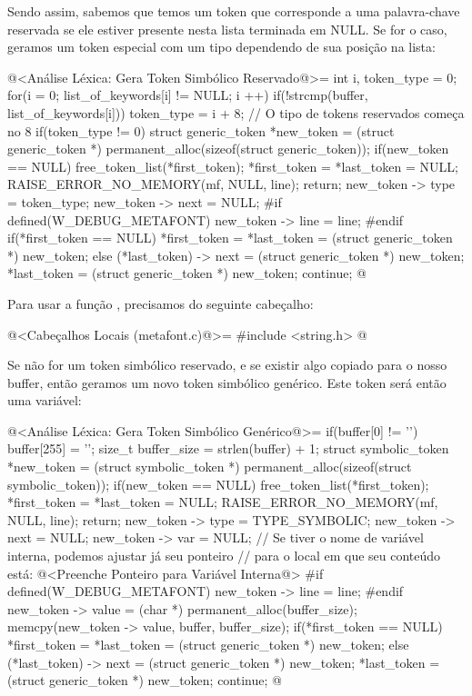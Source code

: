 Sendo assim, sabemos que temos um token que corresponde a uma
palavra-chave reservada se ele estiver presente nesta lista terminada
em NULL. Se for o caso, geramos um token especial com um tipo
dependendo de sua posição na lista:

\iniciocodigo
@<Análise Léxica: Gera Token Simbólico Reservado@>=
{
  int i, token_type = 0;
  for(i = 0; list_of_keywords[i] != NULL; i ++)
    if(!strcmp(buffer, list_of_keywords[i]))
      token_type = i + 8; // O tipo de tokens reservados começa no 8
  if(token_type != 0){
    struct generic_token *new_token =
       (struct generic_token *) permanent_alloc(sizeof(struct generic_token));
    if(new_token == NULL){
      free_token_list(*first_token);
      *first_token = *last_token = NULL;
      RAISE_ERROR_NO_MEMORY(mf, NULL, line);
      return;
    }
    new_token -> type = token_type;
    new_token -> next = NULL;
#if defined(W_DEBUG_METAFONT)
    new_token -> line = line;
#endif
    if(*first_token == NULL)
      *first_token = *last_token = (struct generic_token *) new_token;
    else{
      (*last_token) -> next = (struct generic_token *) new_token;
      *last_token = (struct generic_token *) new_token;
    }
    continue;
  }
}
@
\fimcodigo

Para usar a função , precisamos do seguinte
cabeçalho:

\iniciocodigo
@<Cabeçalhos Locais (metafont.c)@>=
#include <string.h>
@
\fimcodigo

Se não for um token simbólico reservado, e se existir algo copiado
para o nosso buffer, então geramos um novo token simbólico
genérico. Este token será então uma variável:

\iniciocodigo
@<Análise Léxica: Gera Token Simbólico Genérico@>=
if(buffer[0] != '\0'){
  buffer[255] = '\0';
  size_t buffer_size = strlen(buffer) + 1;
  struct symbolic_token *new_token =
     (struct symbolic_token *) permanent_alloc(sizeof(struct symbolic_token));
  if(new_token == NULL){
    free_token_list(*first_token);
    *first_token = *last_token = NULL;
    RAISE_ERROR_NO_MEMORY(mf, NULL, line);
    return;
  }
  new_token -> type = TYPE_SYMBOLIC;
  new_token -> next = NULL;
  new_token -> var = NULL;
  // Se tiver o nome de variável interna, podemos ajustar já seu ponteiro
  // para  o local em que seu conteúdo está:
  @<Preenche Ponteiro para Variável Interna@>
#if defined(W_DEBUG_METAFONT)
  new_token -> line = line;
#endif
  new_token -> value = (char *) permanent_alloc(buffer_size);
  memcpy(new_token -> value, buffer, buffer_size);
  if(*first_token == NULL)
    *first_token = *last_token = (struct generic_token *) new_token;
  else{
    (*last_token) -> next = (struct generic_token *) new_token;
    *last_token = (struct generic_token *) new_token;
  }
  continue;
}
@
\fimcodigo

